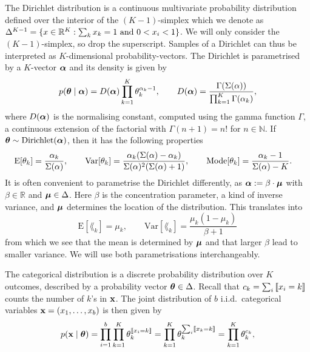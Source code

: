 \documentclass{../src/bcthesispart}
\begin{document}
The Dirichlet distribution is a continuous multivariate probability distribution defined over the interior of the $(K-1)$-simplex which we denote as $\Delta^{K-1}= \{x \in \mathbb{R}^K: \sum_k x_k = 1 \text{ and } 0 < x_i < 1 \}$. 
We will only consider the $(K-1)$-simplex, so drop the superscript.
Samples of a Dirichlet can thus be interpreted as $K$-dimensional probability-vectors.
The Dirichlet is parametrised by a $K$-vector $\boldsymbol{\mathbf{\alpha}}$ and its density is given by
\begin{equation}
	p(\boldsymbol{\mathbf{\theta}} \mid \boldsymbol{\mathbf{\alpha}}) 
		= D(\boldsymbol{\mathbf{\alpha}})
			\prod_{k=1}^K \theta_k^{\alpha_k - 1},
	\qquad 
	D(\boldsymbol{\mathbf{\alpha}})
		= \frac{\Gamma(\Sigma(\alpha))}{\prod_{k=1}^K\Gamma(\alpha_k)}, 
\end{equation}
where $D(\boldsymbol{\mathbf{\alpha}})$ is the normalising constant, computed using the gamma function $\Gamma$, a continuous extension of the factorial with $\Gamma(n+1) = n!$ for $n \in \mathbb{N}$. 
If $\boldsymbol{\mathbf{\theta}} \sim \text{Dirichlet}(\boldsymbol{\mathbf{\alpha}})$, then it has the following properties \parencite[e.g.][]{Bishop2006}
\begin{align}
	\text{E}[\theta_k] 
		&= \frac{\alpha_k}{\Sigma(\alpha)}, 
	\qquad
	\text{Var}[\theta_k] 
		=\frac{\alpha_k ( \Sigma(\alpha) - \alpha_k)}{\Sigma(\alpha)^2(\Sigma(\alpha) + 1)},
	\qquad
	\text{Mode}[\theta_k] 
		= \frac{\alpha_k - 1}{\Sigma(\alpha) - K}.
\end{align}
It is often convenient to parametrise the Dirichlet differently, as $\boldsymbol{\mathbf{\alpha}} := \beta \cdot \boldsymbol{\mathbf{\mu}}$ with $\beta\in\mathbb{R}$ and $\boldsymbol{\mathbf{\mu}}\in\Delta$.
Here $\beta$ is the concentration parameter, a kind of inverse variance, and $\boldsymbol{\mathbf{\mu}}$ determines the location of the distribution. 
This translates into
\begin{equation}
	\text{E}[\lang_k] = \mu_k,\qquad
	\text{Var}[\lang_k] = \frac{\mu_k(1-\mu_k)}{\beta+1}
\end{equation}
from which we see that the mean is determined by $\boldsymbol{\mathbf{\mu}}$ and that larger $\beta$ lead to smaller variance.
We will use both parametrisations interchangeably.




The categorical distribution is a discrete probability distribution over $K$ outcomes, described by a probability vector $\boldsymbol{\mathbf{\theta}} \in \Delta$.
Recall that $c_k = \sum_i \left\llbracket x_i = k\right\rrbracket$ counts the number of $k$'s in $\boldsymbol{\mathbf{x}}$.
The joint distribution of $b$ i.i.d.\ categorical variables $\boldsymbol{\mathbf{x}}= (x_1, \dots, x_b)$ is then given by
\begin{equation}
	\label{eq:app-bng:joint-iid-categoricals}
	p(\boldsymbol{\mathbf{x}} \mid \boldsymbol{\mathbf{\theta}})
		= \prod_{i=1}^b \prod_{k=1}^K \theta_k^{\left\llbracket x_i=k\right\rrbracket} 
		= \prod_{k=1}^K \theta_k^{\sum_i \left\llbracket x_k = k\right\rrbracket} 
		= \prod_{k=1}^K \theta_k^{c_k},
\end{equation}
\end{document}
